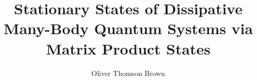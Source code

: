 \documentclass[a4paper,twoside,12pt]{hwthesis}
\begin{document}
\author{Oliver Thomson Brown}
\title{Stationary States of Dissipative Many-Body Quantum Systems via Matrix Product States}

\maketitle
\end{document}
